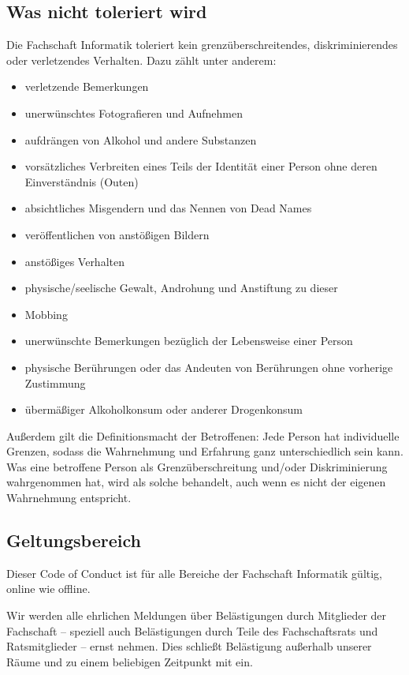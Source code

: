 \documentclass{article}
\begin{document}
\subsection{Was nicht toleriert wird}
Die Fachschaft Informatik toleriert kein grenzüberschreitendes, diskriminierendes oder verletzendes Verhalten. Dazu zählt unter anderem:
\begin{itemize}
    \item verletzende Bemerkungen
    \item unerwünschtes Fotografieren und Aufnehmen
    \item aufdrängen von Alkohol und andere Substanzen
    \item vorsätzliches Verbreiten eines Teils der Identität einer Person ohne deren Einverständnis (Outen)
    \item absichtliches Misgendern und das Nennen von Dead Names
    \item veröffentlichen von anstößigen Bildern
    \item anstößiges Verhalten
    \item physische/seelische Gewalt, Androhung und Anstiftung zu dieser
    \item Mobbing
    \item unerwünschte Bemerkungen bezüglich der Lebensweise einer Person
    \item physische Berührungen oder das Andeuten von Berührungen ohne vorherige Zustimmung
    \item übermäßiger Alkoholkonsum oder anderer Drogenkonsum
\end{itemize}

Außerdem gilt die Definitionsmacht der Betroffenen: Jede Person hat individuelle Grenzen, sodass die Wahrnehmung und Erfahrung ganz unterschiedlich sein kann. Was eine 
betroffene Person als Grenzüberschreitung und/oder Diskriminierung wahrgenommen hat, wird als solche behandelt, auch wenn es nicht der eigenen Wahrnehmung entspricht.

\subsection{Geltungsbereich}
Dieser Code of Conduct ist für alle Bereiche der Fachschaft Informatik gültig, online wie offline.

Wir werden alle ehrlichen Meldungen über Belästigungen durch Mitglieder der Fachschaft – speziell auch Belästigungen durch Teile des Fachschaftsrats und Ratsmitglieder – ernst 
nehmen. Dies schließt Belästigung außerhalb unserer Räume und zu einem beliebigen Zeitpunkt mit ein.
\end{document}
